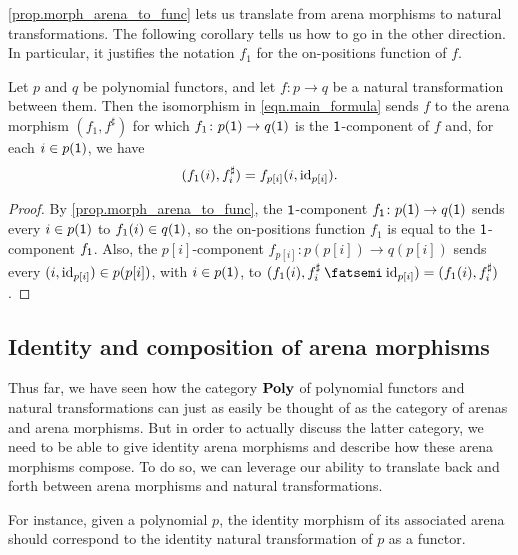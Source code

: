 \documentclass[Book-Poly]{subfiles}
\begin{document}

\cref{prop.morph_arena_to_func} lets us translate from arena morphisms to natural transformations.
The following corollary tells us how to go in the other direction.
In particular, it justifies the notation $f_1$ for the on-positions function of $f$.

\begin{corollary} \label{prop.morph_func_to_arena}
Let $p$ and $q$ be polynomial functors, and let $f \colon p \to q$ be a natural transformation between them.
Then the isomorphism in \eqref{eqn.main_formula} sends $f$ to the arena morphism $(f_1, f^\sharp)$ for which $f_1 \colon p(\textsf{1}) \to q(\textsf{1})$ is the $\textsf{1}$-component of $f$ and, for each $i \in p(\textsf{1})$, we have
\[
    (f_1(i), f^\sharp_i) = f_{p[i]}(i, \mathrm{id}_{p[i]}).
\]
\end{corollary}
\begin{proof}
By \cref{prop.morph_arena_to_func}, the $\textsf{1}$-component $f_{\textsf{1}} \colon p(\textsf{1}) \to q(\textsf{1})$ sends every $i \in p(\textsf{1})$ to $f_1(i) \in q(\textsf{1})$, so the on-positions function $f_1$ is equal to the $\textsf{1}$-component $f_{\textsf{1}}$.
Also, the $p[i]$-component $f_{p[i]} \colon p(p[i]) \to q(p[i])$ sends every $(i, \mathrm{id}_{p[i]}) \in p(p[i])$, with $i \in p(\textsf{1})$, to $(f_1(i), f^\sharp_i \then \id_{p[i]}) = (f_1(i), f^\sharp_i)$.
\end{proof}


\subsection{Identity and composition of arena morphisms} \label{subsec.poly.func_nat.morph.id_comp}

Thus far, we have seen how the category $\mathbf{Poly}$ of polynomial functors and natural transformations can just as easily be thought of as the category of arenas and arena morphisms.
But in order to actually discuss the latter category, we need to be able to give identity arena morphisms and describe how these arena morphisms compose.
To do so, we can leverage our ability to translate back and forth between arena morphisms and natural transformations.

For instance, given a polynomial $p$, the identity morphism of its associated arena should correspond to the identity natural transformation of $p$ as a functor.
\end{document}
